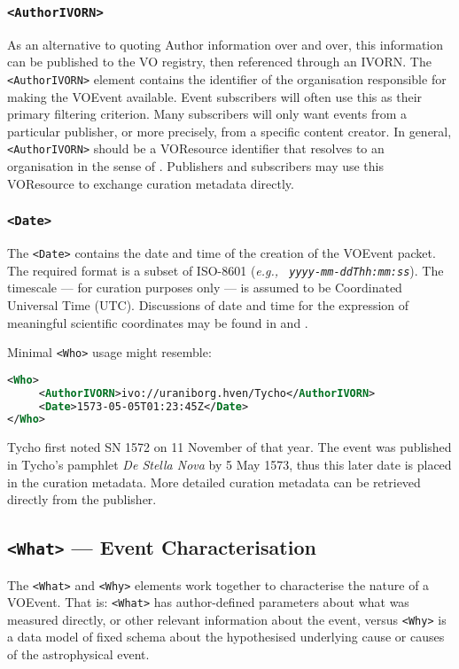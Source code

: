 \documentclass[11pt,a4paper]{ivoa}
\begin{document}
\subsubsection{\tt <AuthorIVORN>}
As an alternative to quoting Author information over and over, this information
can be published to the VO registry, then referenced through an IVORN. The {\tt
<AuthorIVORN>} element contains the identifier of the organisation responsible
for making the VOEvent available. Event subscribers will often use this as their
primary filtering criterion. Many subscribers will only want events from a
particular publisher, or more precisely, from a specific content creator. In
general, {\tt <AuthorIVORN>} should be a VOResource identifier that resolves to
an organisation in the sense of \citep{2007ivoa.spec.0302H}. Publishers and
subscribers may use this VOResource to exchange curation metadata directly.

\subsubsection{\tt <Date>}
The {\tt <Date>} contains the date and time of the creation of the VOEvent
packet. The required format is a subset of ISO-8601 (\emph{e.g., {\tt
yyyy-mm-ddThh:mm:ss}}). The timescale --- for curation purposes only --- is
assumed to be Coordinated Universal Time (UTC). Discussions of date and time for
the expression of meaningful scientific coordinates may be found in
\citep{2007ivoa.spec.1030R} and \citep{bib26}.


Minimal {\tt <Who>} usage might resemble:
\begin{lstlisting}[language=XML]
<Who>
     <AuthorIVORN>ivo://uraniborg.hven/Tycho</AuthorIVORN>
     <Date>1573-05-05T01:23:45Z</Date>
</Who>
\end{lstlisting}
Tycho first noted SN 1572 on 11 November of that year. The event was published
in Tycho's pamphlet \emph{De Stella Nova} by 5 May 1573, thus this later date is
placed in the curation metadata. More detailed curation metadata can be
retrieved directly from the publisher.


\subsection{{\tt <What>} --- Event Characterisation}
\label{sec:3.3}
The {\tt <What>} and {\tt <Why>} elements work together to characterise the
nature of a VOEvent. That is: {\tt <What>} has author-defined parameters about
what was measured directly, or other relevant information about the event,
versus {\tt <Why>} is a data model of fixed schema about the hypothesised
underlying cause or causes of the astrophysical event.
\end{document}
